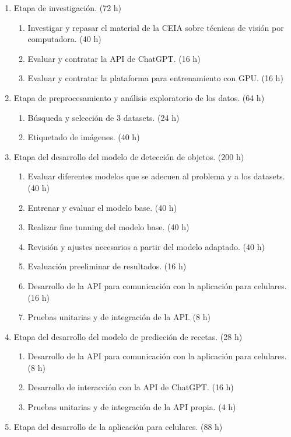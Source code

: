 \documentclass[
11pt, %
]{charter}
\begin{document}
\begin{enumerate}
\item Etapa de investigación. (72 h)
	\begin{enumerate}
	\item Investigar y repasar el material de la CEIA  sobre técnicas de visión por computadora. (40 h)
	\item Evaluar y contratar la API de ChatGPT. (16 h)
	\item Evaluar y contratar la plataforma para entrenamiento con GPU. (16 h)
	\end{enumerate}
\item Etapa de preprocesamiento y análisis exploratorio de los datos. (64 h)
	\begin{enumerate}
	\item Búsqueda y selección de 3 datasets. (24 h)
	\item Etiquetado de imágenes. (40 h)
	\end{enumerate}
\item Etapa del desarrollo del modelo de detección de objetos.  (200 h)
	\begin{enumerate}
	\item Evaluar diferentes modelos que se adecuen al problema y a los datasets. (40 h)
	\item Entrenar y evaluar el modelo base. (40 h)
	\item Realizar fine tunning del modelo base. (40 h)
	\item Revisión y ajustes necesarios a partir del modelo adaptado. (40 h)
	\item Evaluación preeliminar de resultados. (16 h)
	\item Desarrollo de la API para comunicación con la aplicación para celulares. (16 h)
	\item Pruebas unitarias y de integración de la  API. (8 h)
	\end{enumerate}
\item Etapa del desarrollo del modelo de predicción de recetas. (28 h)
	\begin{enumerate}
	\item Desarrollo de la API para comunicación con la aplicación para celulares. (8 h)
	\item Desarrollo de interacción con la API de ChatGPT. (16 h)
	\item Pruebas unitarias y de integración de la  API propia. (4 h)
	\end{enumerate}
\item Etapa del desarrollo de la aplicación para celulares. (88 h) 

\end{enumerate}
\end{document}
